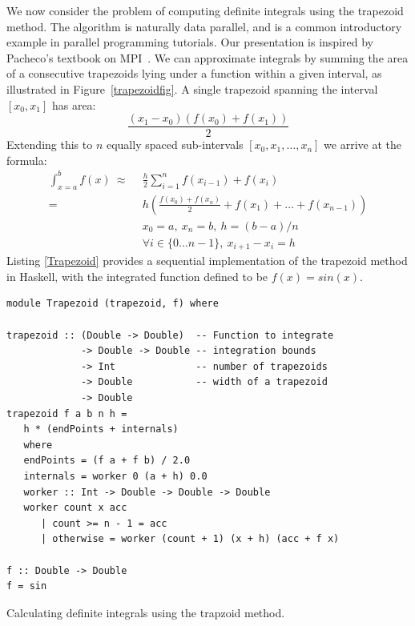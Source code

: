 \documentclass{tmr}
\begin{document}
We now consider the problem of computing definite integrals
using the trapezoid method. The algorithm is naturally data parallel, and is a common
introductory example in parallel programming tutorials. Our presentation is inspired by
Pacheco's textbook on MPI~\cite{Pacheco}.
We can approximate integrals by summing the area of a consecutive
trapezoids lying under a function within a given interval, as illustrated in
Figure~\ref{trapezoidfig}. A single trapezoid spanning the interval
$[x_0,x_1]$ has area:
\begin{equation*}
\frac{(x_1 - x_0)(f(x_0) + f(x_1))}{2}
\end{equation*}
Extending this to $n$ equally spaced sub-intervals $[x_0,x_1,\ldots,x_n]$ we arrive at the formula:
\begin{equation*}
\begin{split}
\int_{x=a}^{b} f(x)\ \approx\ &\ \frac{h}{2} \sum_{i=1}^n f(x_{i-1}) + f(x_i) \\[3mm]
                     =\  &\ h \left(\frac{f(x_0) + f(x_n)}{2} + f(x_1) + \ldots + f(x_{n-1})\right) \\[3mm]
                     &\ x_0 = a,\ x_n = b,\ h = (b - a)/n\\
                     &\ \forall i \in \{0 \ldots n-1\},\ x_{i+1} - x_{i} = h
\end{split}
\end{equation*}
Listing \ref{Trapezoid} provides a sequential implementation of the trapezoid method in Haskell, with
the integrated function defined to be
$f(x) = sin(x)$.


\begin{listing}
\begin{Verbatim}
module Trapezoid (trapezoid, f) where

trapezoid :: (Double -> Double)  -- Function to integrate
             -> Double -> Double -- integration bounds
             -> Int              -- number of trapezoids
             -> Double           -- width of a trapezoid
             -> Double
trapezoid f a b n h =
   h * (endPoints + internals)
   where
   endPoints = (f a + f b) / 2.0
   internals = worker 0 (a + h) 0.0
   worker :: Int -> Double -> Double -> Double
   worker count x acc
      | count >= n - 1 = acc
      | otherwise = worker (count + 1) (x + h) (acc + f x)

f :: Double -> Double
f = sin
\end{Verbatim}
\caption{Calculating definite integrals using the trapzoid method. \label{Trapezoid}}
\end{listing}
\end{document}
